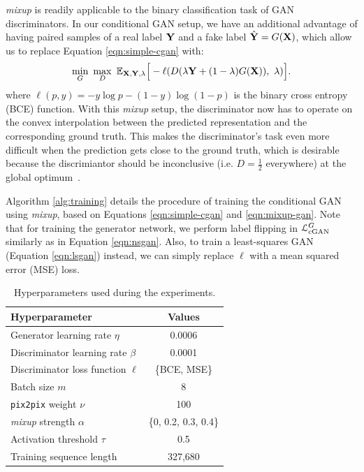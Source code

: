 \textit{mixup} is readily applicable to the binary classification task of GAN discriminators.
In our conditional GAN setup, we have an additional advantage of having paired samples of a real label $\mathbf{Y}$ and a fake label $\hat{\mathbf{Y}} = G(\mathbf{X})$, which allow us to replace Equation \ref{eqn:simple-cgan} with:
\begin{equation}\label{eqn:mixup-gan}
\min_{G} ~ \max_{D} ~ \mathbb{E}_{\mathbf{X},\mathbf{Y},\lambda} \Big [ - \ell (D(\lambda \mathbf{Y} + (1 - \lambda) G(\mathbf{X}) ), ~ \lambda) \Big ].
\end{equation}
where $\ell(p, y) = - y \log p - (1-y) \log (1-p)$ is the binary cross entropy (BCE) function.
With this \textit{mixup} setup, the discriminator now has to operate on the convex interpolation between the predicted representation and the corresponding ground truth.
This makes the discriminator's task even more difficult when the prediction gets close to the ground truth, which is desirable because the discrimiantor should be inconclusive (i.e. $D = \tfrac{1}{2}$ everywhere) at the global optimum~\cite{goodfellow2014gan}.

Algorithm \ref{alg:training} details the procedure of training the conditional GAN using \textit{mixup}, based on Equations \ref{eqn:simple-cgan} and \ref{eqn:mixup-gan}.
Note that for training the generator network, we perform label flipping in $\mathcal{L}_{\text{cGAN}}^G$ similarly as in Equation \ref{eqn:nsgan}.
Also, to train a least-squares GAN (Equation \ref{eqn:lsgan}) instead, we can simply replace $\ell$ with a mean squared error (MSE) loss.


\begin{table}[t]
	\small
	\renewcommand\arraystretch{1.2}
	\renewcommand{\tabcolsep}{5pt}
	\centering
	\begin{tabular}{l c} \toprule
		Hyperparameter & Values \\ \hline
		Generator learning rate $\eta$ & 0.0006 \\ 
		Discriminator learning rate $\beta$ & 0.0001 \\
		Discriminator loss function $\ell$ & \{BCE, MSE\}\\
		Batch size $m$ & 8 \\
		\texttt{pix2pix} weight $\nu$ & 100 \\
		\textit{mixup} strength $\alpha$ & \{0, 0.2, 0.3, 0.4\} \\
		Activation threshold $\tau$ & 0.5 \\
		Training sequence length & 327,680 \\
		\bottomrule
	\end{tabular}
	\vspace{1em}
	\caption{Hyperparameters used during the experiments.}\label{tab:hyperparameters}
\end{table}

